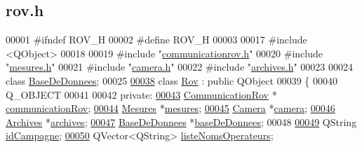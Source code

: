 \hypertarget{rov_8h_source}{}\subsection{rov.\+h}

\begin{DoxyCode}
00001 \textcolor{preprocessor}{#ifndef ROV\_H}
00002 \textcolor{preprocessor}{#define ROV\_H}
00003 
00017 \textcolor{preprocessor}{#include <QObject>}
00018 
00019 \textcolor{preprocessor}{#include "\hyperlink{communicationrov_8h}{communicationrov.h}"}
00020 \textcolor{preprocessor}{#include "\hyperlink{mesures_8h}{mesures.h}"}
00021 \textcolor{preprocessor}{#include "\hyperlink{camera_8h}{camera.h}"}
00022 \textcolor{preprocessor}{#include "\hyperlink{archives_8h}{archives.h}"}
00023 
00024 \textcolor{keyword}{class }\hyperlink{class_base_de_donnees}{BaseDeDonnees};
00025 
\hyperlink{class_rov}{00038} \textcolor{keyword}{class }\hyperlink{class_rov}{Rov} : \textcolor{keyword}{public} QObject
00039 \{
00040     Q\_OBJECT
00041 
00042     \textcolor{keyword}{private}:
\hyperlink{class_rov_a8e7aaa17ee2134f26d57241d11ab2a99}{00043}         \hyperlink{class_communication_rov}{CommunicationRov} * \hyperlink{class_rov_a8e7aaa17ee2134f26d57241d11ab2a99}{communicationRov};  
\hyperlink{class_rov_af37589b38493e4bd99702587db2d28a8}{00044}         \hyperlink{class_mesures}{Mesures} *\hyperlink{class_rov_af37589b38493e4bd99702587db2d28a8}{mesures};                     
\hyperlink{class_rov_ad0461ecece812497ee9b4a962f168c18}{00045}         \hyperlink{class_camera}{Camera} *\hyperlink{class_rov_ad0461ecece812497ee9b4a962f168c18}{camera};                       
\hyperlink{class_rov_ad41ed46f169f28da226a979f70c4d8a4}{00046}         \hyperlink{class_archives}{Archives} *\hyperlink{class_rov_ad41ed46f169f28da226a979f70c4d8a4}{archives};                   
\hyperlink{class_rov_a5a9a824cd100947c75d0951eb9e1f90c}{00047}         \hyperlink{class_base_de_donnees}{BaseDeDonnees} *\hyperlink{class_rov_a5a9a824cd100947c75d0951eb9e1f90c}{baseDeDonnees};         
00048 
\hyperlink{class_rov_aaaed58cd7ee9edbeab5251cd413a1bae}{00049}         QString \hyperlink{class_rov_aaaed58cd7ee9edbeab5251cd413a1bae}{idCampagne};                      
\hyperlink{class_rov_a3d424033e0ff00f480a711358ef4fde6}{00050}         QVector<QString> \hyperlink{class_rov_a3d424033e0ff00f480a711358ef4fde6}{listeNomsOperateurs};    

\end{DoxyCode}
